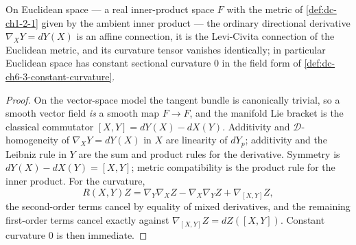 \begin{lemma}
  \label{lem:dc-ch6-2-8-euclidean}
  \leanok
  On Euclidean space — a real inner-product space $F$ with the metric of
  \cref{def:dc-ch1-2-1} given by the ambient inner product — the ordinary
  directional derivative $\nabla_XY=dY(X)$ is an affine connection, it is the
  Levi-Civita connection of the Euclidean metric, and its curvature tensor
  vanishes identically; in particular Euclidean space has constant sectional
  curvature $0$ in the field form of \cref{def:dc-ch6-3-constant-curvature}.
\end{lemma}
\begin{proof}
  \leanok
  \sketch
  On the vector-space model the tangent bundle is canonically trivial, so a
  smooth vector field \emph{is} a smooth map $F\to F$, and the manifold Lie
  bracket is the classical commutator $[X,Y]=dY(X)-dX(Y)$. Additivity and
  $\mathcal{D}$-homogeneity of $\nabla_XY=dY(X)$ in $X$ are linearity of
  $dY_p$; additivity and the Leibniz rule in $Y$ are the sum and product rules
  for the derivative. Symmetry is $dY(X)-dX(Y)=[X,Y]$; metric compatibility is
  the product rule for the inner product. For the curvature,
  $$
  R(X,Y)Z=\nabla_Y\nabla_XZ-\nabla_X\nabla_YZ+\nabla_{[X,Y]}Z ,
  $$
  the second-order terms cancel by equality of mixed derivatives, and the remaining first-order terms cancel exactly against
  $\nabla_{[X,Y]}Z=dZ([X,Y])$. Constant curvature $0$ is then immediate.
\end{proof}

